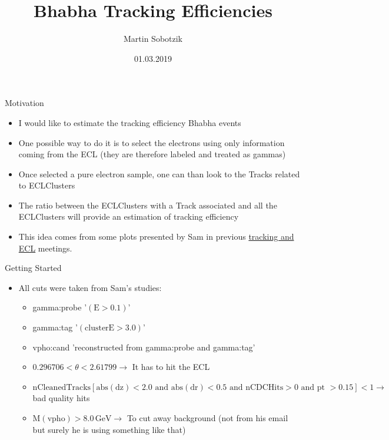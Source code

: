 \documentclass[10pt]{beamer}
\title{Bhabha Tracking Efficiencies}
\date{01.03.2019}
\author{Martin Sobotzik}
\institute{Johannes Gutenberg Universit\"at Mainz}
\begin{document}
\maketitle
{%



\begin{frame}{Motivation}

\begin{itemize}	
	\item I would like to estimate the tracking efficiency Bhabha events
	\item One possible way to do it is to select the electrons using only information coming from the ECL (they are therefore labeled and treated as gammas)
	
	\item Once selected a pure electron sample, one can than look to the Tracks related to ECLClusters
	\item The ratio between the ECLClusters with a Track associated and all the ECLClusters will provide an estimation of tracking efficiency
	\item This idea comes from some plots presented by Sam in previous  \href{https://confluence.desy.de/display/BI/ECL+Meetings?preview=/84320165/109161400/SCunliffe181123-ECL.pdf}{tracking and ECL} meetings. 

\end{itemize}
\end{frame}
	
\begin{frame}{Getting Started}
	
\begin{itemize} 
	\item All cuts were taken from Sam's studies:
	
	
	\begin{itemize}
		\item gamma:probe '$(\textrm{E} > 0.1 )$'
		\item gamma:tag '$(\textrm{clusterE} > 3.0)$'
		\item vpho:cand 'reconstructed from gamma:probe and gamma:tag'
	\end{itemize}

	
		\begin{itemize}
			\item $0.296706 < \theta < 2.61799 \rightarrow$ It has to hit the ECL
			\item $\textrm{nCleanedTracks}[ \textrm{abs}(\textrm{dz}) < 2.0 \textrm{ and } \textrm{abs}(\textrm{dr}) < 0.5 \textrm{ and nCDCHits} > 0 \textrm{ and pt } > 0.15] < 1 \rightarrow $ bad quality hits 
			\item $\textrm{M}(\textrm{vpho}) > 8.0\,\textrm{GeV} \rightarrow $ To cut away background (not from his email but surely he is using something like that)					
		\end{itemize}
	

\end{itemize}
\end{frame}}
\end{document}
